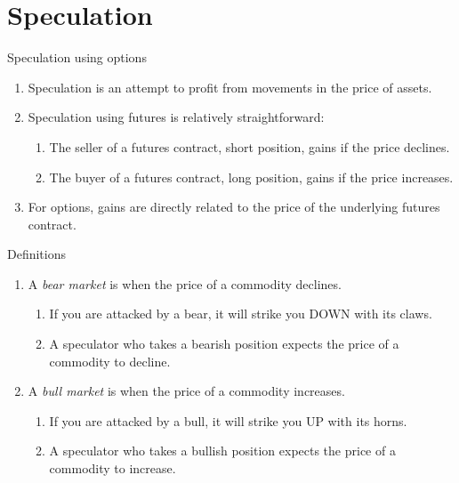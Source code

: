 \documentclass[table,xcolor=pdftex,dvipsnames]{beamer}\usepackage[]{graphicx}\usepackage[]{color}
\begin{document}
\section{Speculation}

\begin{frame}{Speculation using options}
\begin{enumerate}[label=\textbullet]
  \item Speculation is an attempt to profit from movements in the price of assets.
  \item Speculation using futures is relatively straightforward:
      \begin{enumerate}[label=-]
          \item The seller of a futures contract, short position, gains if the price declines.
          \item The buyer of a futures contract, long position, gains  if the price increases.
       \end{enumerate}
  \item For options, gains are directly related to the price of the underlying futures contract.
\end{enumerate}
\end{frame}


\begin{frame}{Definitions}
\begin{enumerate}[label=\textbullet]
    \item A \emph{bear market} is when the price of a commodity declines.
      \begin{enumerate}[label=-]
          \item If you are attacked by a bear, it will strike you DOWN with its claws.
          \item A speculator who takes a bearish position expects the price of a commodity to decline.
       \end{enumerate}
    \item A \emph{bull market} is when the price of a commodity increases.
      \begin{enumerate}[label=-]
          \item If you are attacked by a bull, it will strike you UP with its horns.
          \item A speculator who takes a bullish position expects the price of a commodity to increase.
       \end{enumerate}
\end{enumerate}
\end{frame}
\end{document}
